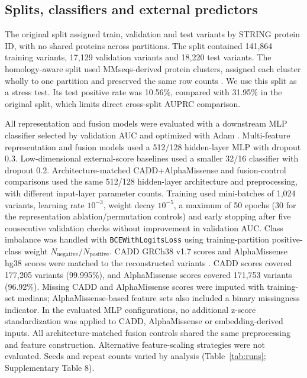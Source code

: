 \documentclass[conference]{IEEEtran}
\newcommand{\CADDAM}{CADD\allowbreak{}+\allowbreak{}AlphaMissense}
\begin{document}
\subsection{Splits, classifiers and external predictors}

The original split assigned train, validation and test variants by STRING protein ID, with no shared proteins across partitions. The split contained 141,864 training variants, 17,129 validation variants and 18,220 test variants. The homology-aware split used MMseqs-derived protein clusters, assigned each cluster wholly to one partition and preserved the same row counts \cite{Steinegger2017MMseqs2}. We use this split as a stress test. Its test positive rate was 10.56\%, compared with 31.95\% in the original split, which limits direct cross-split AUPRC comparison.

All representation and fusion models were evaluated with a downstream MLP classifier selected by validation AUC and optimized with Adam \cite{Kingma2015Adam}. Multi-feature representation and fusion models used a 512/128 hidden-layer MLP with dropout 0.3. Low-dimensional external-score baselines used a smaller 32/16 classifier with dropout 0.2. Architecture-matched \CADDAM{} and fusion-control comparisons used the same 512/128 hidden-layer architecture and preprocessing, with different input-layer parameter counts. Training used mini-batches of 1,024 variants, learning rate $10^{-3}$, weight decay $10^{-5}$, a maximum of 50 epochs (30 for the representation ablation/permutation controls) and early stopping after five consecutive validation checks without improvement in validation AUC. Class imbalance was handled with \texttt{BCEWithLogitsLoss} using training-partition positive-class weight $N_{\mathrm{negative}}/N_{\mathrm{positive}}$. CADD GRCh38 v1.7 scores and AlphaMissense hg38 scores were matched to the reconstructed variants \cite{Kircher2014CADD,Schubach2024CADDv17,Cheng2023AlphaMissense}. CADD scores covered 177,205 variants (99.995\%), and AlphaMissense scores covered 171,753 variants (96.92\%). Missing CADD and AlphaMissense scores were imputed with training-set medians; AlphaMissense-based feature sets also included a binary missingness indicator. In the evaluated MLP configurations, no additional z-score standardization was applied to CADD, AlphaMissense or embedding-derived inputs. All architecture-matched fusion controls shared the same preprocessing and feature construction. Alternative feature-scaling strategies were not evaluated. Seeds and repeat counts varied by analysis (Table~\ref{tab:runs}; Supplementary Table 8).
\end{document}
